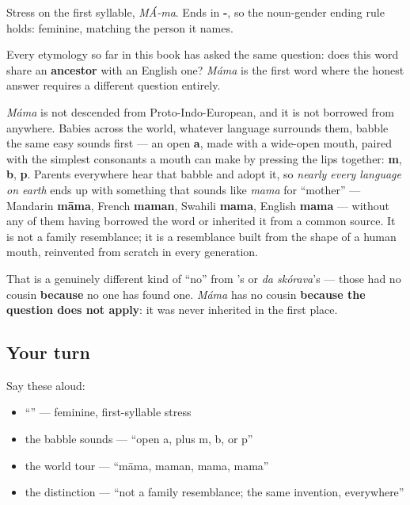 Stress on the first syllable, \emph{MÁ-ma}. Ends in \textbf{-}, so the noun-gender ending rule holds: feminine, matching the person it names.

\begin{cousinweb}
Every etymology so far in this book has asked the same question: does this word share an \textbf{ancestor} with an English one? \emph{Máma} is the first word where the honest answer requires a different question entirely.

\emph{Máma} is not descended from Proto-Indo-European, and it is not borrowed from anywhere. Babies across the world, whatever language surrounds them, babble the same easy sounds first — an open \textbf{a}, made with a wide-open mouth, paired with the simplest consonants a mouth can make by pressing the lips together: \textbf{m}, \textbf{b}, \textbf{p}. Parents everywhere hear that babble and adopt it, so \emph{nearly every language on earth} ends up with something that sounds like \emph{mama} for \textquotedblleft{}mother\textquotedblright{} — Mandarin \textbf{māma}, French \textbf{maman}, Swahili \textbf{mama}, English \textbf{mama} — without any of them having borrowed the word or inherited it from a common source. It is not a family resemblance; it is a resemblance built from the shape of a human mouth, reinvented from scratch in every generation.

That is a genuinely different kind of \textquotedblleft{}no\textquotedblright{} from \emph{}'s or \emph{da skórava}'s — those had no cousin \textbf{because} no one has found one. \emph{Máma} has no cousin \textbf{because the question does not apply}: it was never inherited in the first place.
\end{cousinweb}

\subsection*{Your turn}
Say these aloud:

\begin{itemize}
\raggedright
  \item \textquotedblleft{}\textquotedblright{} — feminine, first-syllable stress
  \item the babble sounds — \textquotedblleft{}open a, plus m, b, or p\textquotedblright{}
  \item the world tour — \textquotedblleft{}māma, maman, mama, mama\textquotedblright{}
  \item the distinction — \textquotedblleft{}not a family resemblance; the same invention, everywhere\textquotedblright{}
\end{itemize}

